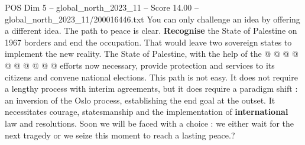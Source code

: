 \begin{textsample}{POS Dim 5 – global\_north\_2023\_11 – Score 14.00 – global\_north\_2023\_11/200016446.txt}
You can only challenge an idea by offering a different idea.
The path to peace is clear. \textbf{Recognise} the State of Palestine on 1967 borders and end the occupation.
That would leave two sovereign states to implement the new reality.
The State of Palestine, with the help of the @ @ @ @ @ @ @ @ @ @ efforts now necessary, provide protection and services to its citizens and convene national elections.
This path is not easy.
It does not require a lengthy process with interim agreements, but it does require a paradigm shift : an inversion of the Oslo process, establishing the end goal at the outset.
It necessitates courage, statesmanship and the implementation of \textbf{international} law and resolutions.
Soon we will be faced with a choice : we either wait for the next tragedy or we seize this moment to reach a lasting peace.?

\end{textsample}
